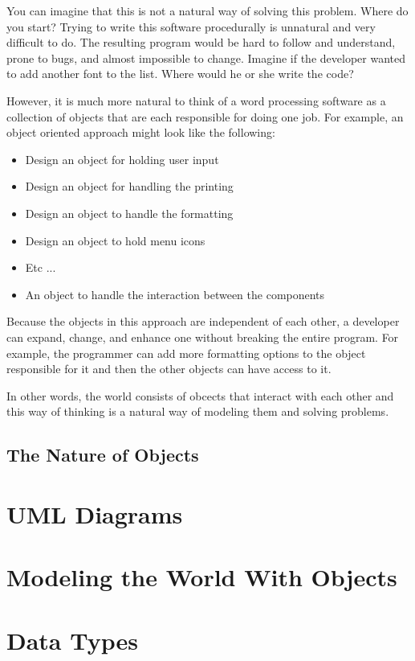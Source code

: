 You can imagine that this is not a natural way of solving this problem. Where do you start? Trying to write this software procedurally is unnatural and very difficult to do. The resulting program would be hard to follow and understand, prone to bugs, and almost impossible to change. Imagine if the developer wanted to add another font to the list. Where would he or she write the code? 

However, it is much more natural to think of a word processing software as a collection of objects that are each responsible for doing one job. For example, an object oriented approach might look like the following:
\begin{itemize}
	\item Design an object for holding user input
	\item Design an object for handling the printing
	\item Design an object to handle the formatting
	\item Design an object to hold menu icons
	\item Etc ...
	\item An object to handle the interaction between the components
\end{itemize}

Because the objects in this approach are independent of each other, a developer can expand, change, and enhance one without breaking the entire program. For example, the programmer can add more formatting options to the object responsible for it and then the other objects can have access to it.

In other words, the world consists of obcects that interact with each other and this way of thinking is a natural way of modeling them and solving problems.

\subsection{The Nature of Objects}



\section{UML Diagrams}


\section{Modeling the World With Objects}

\section{Data Types}

